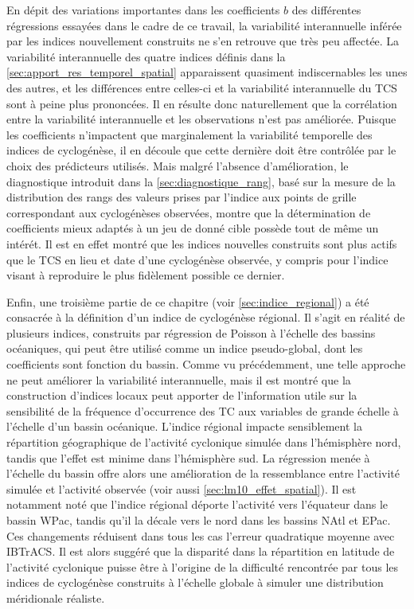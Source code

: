\documentclass[../main.tex]{subfiles}
\begin{document}
En dépit des variations importantes dans les coefficients $b$ des différentes régressions essayées dans le cadre de ce travail, la variabilité interannuelle
inférée par les indices nouvellement construits ne s'en retrouve que très peu affectée. La variabilité interannuelle des quatre indices définis dans la
\cref{sec:apport_res_temporel_spatial} apparaissent quasiment indiscernables les unes des autres, et les différences entre celles-ci et la variabilité
interannuelle du TCS sont à peine plus prononcées. Il en résulte donc naturellement que la corrélation entre la variabilité interannuelle et les observations
n'est pas améliorée. Puisque les coefficients n'impactent que marginalement la variabilité temporelle des indices de cyclogénèse, il en découle que cette
dernière doit être contrôlée par le choix des prédicteurs utilisés. Mais malgré l'absence d'amélioration, le diagnostique introduit dans la
\cref{sec:diagnostique_rang}, basé sur la mesure de la distribution des rangs des valeurs prises par l'indice aux points de grille correspondant aux
cyclogénèses observées, montre que la détermination de coefficients mieux adaptés à un jeu de donné cible possède tout de même un intérét. Il est en effet
montré que les indices nouvelles construits sont plus actifs que le TCS en lieu et date d'une cyclogénèse observée, y compris pour l'indice visant à reproduire
le plus fidèlement possible ce dernier.

Enfin, une troisième partie de ce chapitre (voir \cref{sec:indice_regional}) a été consacrée à la définition d'un indice de cyclogénèse régional. Il s'agit en
réalité de plusieurs indices, construits par régression de Poisson à l'échelle des bassins océaniques, qui peut être utilisé comme un indice pseudo-global, dont
les coefficients sont fonction du bassin. Comme vu précédemment, une telle approche ne peut améliorer la variabilité interannuelle, mais il est montré que la
construction d'indices locaux peut apporter de l'information utile sur la sensibilité de la fréquence d'occurrence des TC aux variables de grande échelle à
l'échelle d'un bassin océanique. L'indice régional impacte sensiblement la répartition géographique de l'activité cyclonique simulée dans l'hémisphère nord,
tandis que l'effet est minime dans l'hémisphère sud. La régression menée à l'échelle du bassin offre alors une amélioration de la ressemblance entre l'activité
simulée et l'activité observée (voir aussi \cref{sec:lm10_effet_spatial}). Il est notamment noté que l'indice régional déporte l'activité vers l'équateur dans
le bassin WPac, tandis qu'il la décale vers le nord dans les bassins NAtl et EPac. Ces changements réduisent dans tous les cas l'erreur quadratique moyenne avec
IBTrACS. Il est alors suggéré que la disparité dans la répartition en latitude de l'activité cyclonique puisse être à l'origine de la difficulté rencontrée par
tous les indices de cyclogénèse construits à l'échelle globale à simuler une distribution méridionale réaliste.
\end{document}
